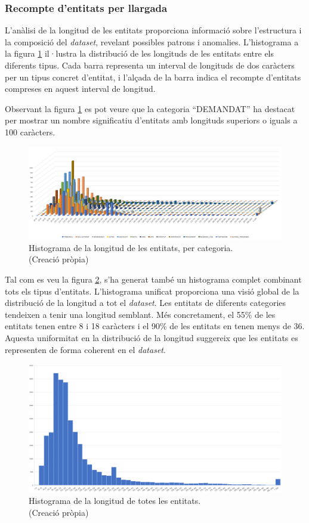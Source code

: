 \subsubsection{Recompte d'entitats per llargada}
L'anàlisi de la longitud de les entitats proporciona informació sobre l'estructura i la composició del \textit{dataset}, revelant possibles patrons i anomalies. L'histograma a la figura \ref{fig:histograma_entitats_tipus} il·lustra la distribució de les longituds de les entitats entre els diferents tipus. Cada barra representa un interval de longituds de dos caràcters per un tipus concret d'entitat, i l'alçada de la barra indica el recompte d'entitats compreses en aquest interval de longitud.

Observant la figura \ref{fig:histograma_entitats_tipus} es pot veure que la categoria ``DEMANDAT'' ha destacat per mostrar un nombre significatiu d'entitats amb longituds superiors o iguals a 100 caràcters.

\begin{figure}[H]
  \centering
  \includegraphics[width=\textwidth]{hist_ent_categoria.png}
  \caption[Histograma de la longitud de les entitats, per categoria]{Histograma de la longitud de les entitats, per categoria. \\ (Creació pròpia)}
  \label{fig:histograma_entitats_tipus}
\end{figure}

Tal com es veu la figura \ref{fig:histograma_entitats_total}, s'ha generat també un histograma complet combinant tots els tipus d'entitats. L'histograma unificat proporciona una visió global de la distribució de la longitud a tot el \textit{dataset}. Les entitats de diferents categories tendeixen a tenir una longitud semblant. Més concretament, el 55\% de les entitats tenen entre 8 i 18 caràcters i el 90\% de les entitats en tenen menys de 36. Aquesta uniformitat en la distribució de la longitud suggereix que les entitats es representen de forma coherent en el \textit{dataset}.

\begin{figure}[H]
  \centering
  \includegraphics[width=\textwidth]{hist_ent_tot.png}
  \caption[Histograma de la longitud de totes les entitats]{Histograma de la longitud de totes les entitats. \\ (Creació pròpia)}
  \label{fig:histograma_entitats_total}
\end{figure}

